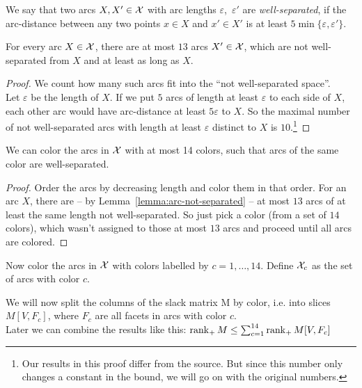 \begin{definition}
  We say that two arcs $X,X' \in \mathcal{X}$ with arc lengths $\varepsilon$,~$\varepsilon'$ are \emph{well-separated}, if the arc-distance between any two points $x \in X$ and $x' \in X'$ is at least $5 \min\{\varepsilon, \varepsilon'\}$.
\end{definition}

\begin{lemma}\label{lemma:arc-not-separated}
  For every arc $X \in \mathcal{X}$, there are at most $13$ arcs $X' \in \mathcal{X}$, which are not well-separated from $X$ and at least as long as $X$.
\end{lemma}

\begin{proof}
  We count how many such arcs fit into the ``not well-separated space''.\\
  Let $\varepsilon$ be the length of $X$. If we put $5$ arcs of length at least $\varepsilon$ to each side of $X$, each other arc would have arc-distance at least $5\varepsilon$ to $X$. So the maximal number of not well-separated arcs with length at least $\varepsilon$ distinct to $X$ is $10$.\footnote{Our results in this proof differ from the source. But since this number only changes a constant in the bound, we will go on with the original numbers.} 
\end{proof}

\begin{lemma}
  We can color the arcs in $\mathcal{X}$ with at most 14 colors, such that arcs of the same color are well-separated.
\end{lemma}

\begin{proof}
  Order the arcs by decreasing length and color them in that order. For an arc $X$, there are -- by Lemma~\ref{lemma:arc-not-separated} -- at most $13$ arcs of at least the same length not well-separated. So just pick a color (from a set of $14$ colors), which wasn't assigned to those at most $13$ arcs and proceed until all arcs are colored.
\end{proof}

Now color the arcs in $\mathcal{X}$ with colors labelled by $c=1,\dots,14$. Define $\mathcal{X}_c$ as the set of arcs with color $c$.

We will now split the columns of the slack matrix M by color, i.e. into slices $M[V,F_c]$, where $F_c$ are all facets in arcs with color $c$.\\
Later we can combine the results like this: $\operatorname{rank}_+M \leq \sum_{c=1}^{14} \operatorname{rank}_+ M[V,F_c]$


